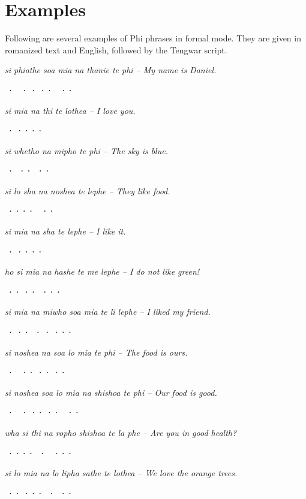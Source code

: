 \section{Examples}
Following are several examples of Phi phrases in formal mode. They are given in
romanized text and English, followed by the Tengwar script.
\setlength{\parskip}{1.5em}

{\parindent0pt
\emph{si phiathe soa mia na thanie te phi -- My name is Daniel.}
\setlength{\parskip}{0.3em}

\ttmedium ⸱⸱⸱⸱⸱⸱⸱ \normalfont
\setlength{\parskip}{1.5em}

\emph{si mia na thi te lothea -- I love you.}
\setlength{\parskip}{0.3em}

\ttmedium ⸱⸱⸱⸱⸱ \normalfont
\setlength{\parskip}{1.5em}

\emph{si whetho na mipho te phi -- The sky is blue.}
\setlength{\parskip}{0.3em}

\ttmedium ⸱⸱⸱⸱⸱ \normalfont
\setlength{\parskip}{1.5em}

\emph{si lo sha na noshea te lephe -- They like food.}
\setlength{\parskip}{0.3em}

\ttmedium ⸱⸱⸱⸱⸱⸱ \normalfont
\setlength{\parskip}{1.5em}

\emph{si mia na sha te lephe -- I like it.}
\setlength{\parskip}{0.3em}

\ttmedium ⸱⸱⸱⸱⸱ \normalfont
\setlength{\parskip}{1.5em}

\emph{ho si mia na hashe te me lephe -- I do not like green!}
\setlength{\parskip}{0.3em}

\ttmedium ⸱⸱⸱⸱⸱⸱⸱ \normalfont
\setlength{\parskip}{1.5em}

\emph{si mia na miwho soa mia te li lephe -- I liked my friend.}
\setlength{\parskip}{0.3em}

\ttmedium ⸱⸱⸱⸱⸱⸱⸱⸱ \normalfont
\setlength{\parskip}{1.5em}

\emph{si noshea na soa lo mia te phi -- The food is ours.}
\setlength{\parskip}{0.3em}

\ttmedium ⸱⸱⸱⸱⸱⸱⸱ \normalfont

\clearpage
\emph{si noshea soa lo mia na shishoa te phi -- Our food is good.}
\setlength{\parskip}{0.3em}

\ttmedium ⸱⸱⸱⸱⸱⸱⸱⸱ \normalfont
\setlength{\parskip}{1.5em}

\emph{wha si thi na ropho shishoa te la phe -- Are you in good health?}
\setlength{\parskip}{0.3em}

\ttmedium ⸱⸱⸱⸱⸱⸱⸱⸱ \normalfont
\setlength{\parskip}{1.5em}

\emph{si lo mia na lo lipha sathe te lothea -- We love the orange trees.}
\setlength{\parskip}{0.3em}

\ttmedium ⸱⸱⸱⸱⸱⸱⸱⸱ \normalfont
\setlength{\parskip}{1em}
}
